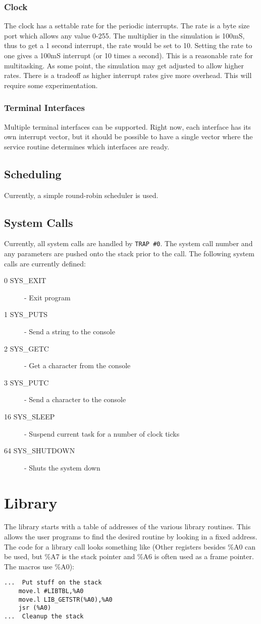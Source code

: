 \documentclass[10pt]{article}
\begin{document}
\subsubsection{Clock}
The clock has a settable rate for the periodic interrupts.  The rate is a byte size port which allows any value 0-255.  The multiplier in the simulation is 100mS, thus to get a 1 second interrupt, the rate would be set to 10.  Setting the rate to one gives a 100mS interrupt (or 10 times a second).  This is a reasonable rate for multitasking.  As some point, the simulation may get adjusted to allow higher rates.  There is a tradeoff as higher interrupt rates give more overhead.  This will require some experimentation.

\subsubsection{Terminal Interfaces}
Multiple terminal interfaces can be supported.  Right now, each interface has its own interrupt vector, but it should be possible to have a single vector where the service routine determines which interfaces are ready.

\subsection{Scheduling}
Currently, a simple round-robin scheduler is used.

\subsection{System Calls}
Currently, all system calls are handled by \verb|TRAP #0|.  The system call number and any parameters are pushed onto the stack prior to the call.  The following system calls are currently defined:
\begin{description}
  \item[0 SYS\_EXIT] - Exit program
  \item[1 SYS\_PUTS] - Send a string to the console
  \item[2 SYS\_GETC] - Get a character from the console
  \item[3 SYS\_PUTC] - Send a character to the console
  \item[16 SYS\_SLEEP] - Suspend current task for a number of clock ticks
  \item[64 SYS\_SHUTDOWN] - Shuts the system down
\end{description}

\section{Library}
The library starts with a table of addresses of the various library routines.  This allows the user programs to find the desired routine by looking in a fixed address.  The code for a library call looks something like (Other registers besides \%A0 can be used, but \%A7 is the stack pointer and \%A6 is often used as a frame pointer.  The macros use \%A0):
\begin{lstlisting}
...  Put stuff on the stack
    move.l #LIBTBL,%A0
    move.l LIB_GETSTR(%A0),%A0
    jsr (%A0)
...  Cleanup the stack
\end{lstlisting}
\end{document}

